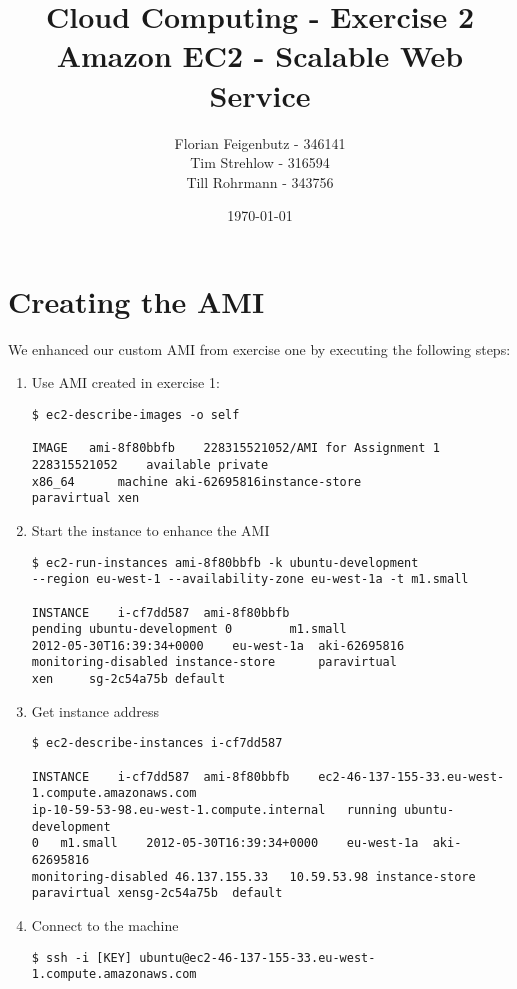 \documentclass{article}
\title{Cloud Computing - Exercise 2\\
Amazon EC2 - Scalable Web Service}
\author{Florian Feigenbutz - 346141\\
Tim Strehlow - 316594\\
Till Rohrmann - 343756}
\date{\today}
\begin{document}


\maketitle

\setcounter{section}{0}
\section{Creating the AMI}
We enhanced our custom AMI from exercise one by executing the following steps:
\begin{enumerate}

	\item Use AMI created in exercise 1:
\begin{verbatim}
$ ec2-describe-images -o self

IMAGE	ami-8f80bbfb	228315521052/AMI for Assignment 1	
228315521052	available private		
x86_64		machine	aki-62695816instance-store	
paravirtual	xen
\end{verbatim}

	\item Start the instance to enhance the AMI
\begin{verbatim}
$ ec2-run-instances ami-8f80bbfb -k ubuntu-development 
--region eu-west-1 --availability-zone eu-west-1a -t m1.small

INSTANCE	i-cf7dd587	ami-8f80bbfb	
pending	ubuntu-development 0		m1.small	
2012-05-30T16:39:34+0000	eu-west-1a	aki-62695816
monitoring-disabled	instance-store		paravirtual
xen		sg-2c54a75b	default
\end{verbatim}

	\item Get instance address
\begin{verbatim}
$ ec2-describe-instances i-cf7dd587

INSTANCE	i-cf7dd587	ami-8f80bbfb	ec2-46-137-155-33.eu-west-1.compute.amazonaws.com 
ip-10-59-53-98.eu-west-1.compute.internal	running	ubuntu-development
0	m1.small	2012-05-30T16:39:34+0000	eu-west-1a	aki-62695816
monitoring-disabled	46.137.155.33	10.59.53.98	instance-store	paravirtual	xensg-2c54a75b	default
\end{verbatim}

	\item Connect to the machine
\begin{verbatim}
$ ssh -i [KEY] ubuntu@ec2-46-137-155-33.eu-west-1.compute.amazonaws.com
\end{verbatim}


\end{enumerate}
\end{document}

